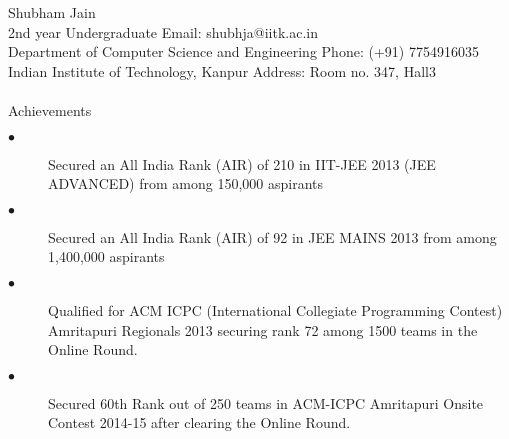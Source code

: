 \documentclass{article}
\begin{document}
{\Large Shubham Jain}
\vspace{2mm}
\\
2nd year Undergraduate \hfill Email: shubhja@iitk.ac.in
\\
Department of Computer Science and Engineering \hfill Phone: (+91) 7754916035
\\
Indian Institute of Technology, Kanpur  \hfill      Address: Room no. 347, Hall3
\\
\\
{\large Achievements}
\vspace{-5mm}
\begin{description}
 \item[$\bullet $] Secured an All India Rank (AIR) of 210 in IIT-JEE 2013 (JEE ADVANCED) from among 150,000 aspirants
 \item[$\bullet $] Secured an All India Rank (AIR) of 92 in JEE MAINS 2013 from among 1,400,000 aspirants
 \item[$\bullet $] Qualified for ACM ICPC (International Collegiate Programming Contest) Amritapuri Regionals 2013 securing rank 72 among 1500 teams in the Online Round.
 \item[$\bullet $] Secured 60th Rank out of 250 teams in ACM-ICPC Amritapuri Onsite Contest 2014-15 after clearing the Online Round.
\end{description}
\end{document}
